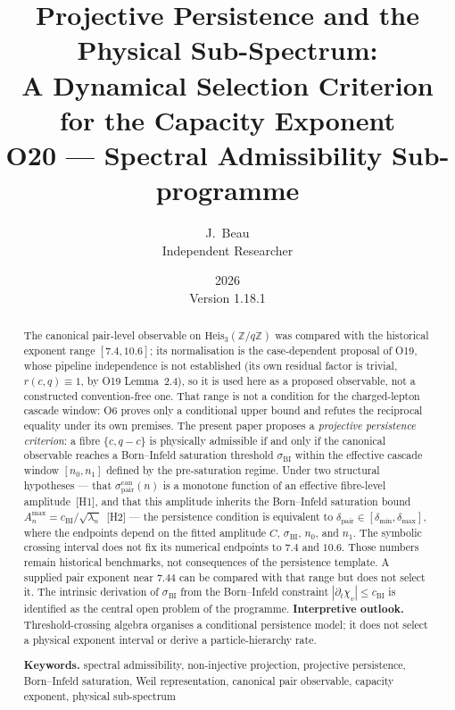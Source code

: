 \documentclass[11pt,a4paper]{article}
\title{Projective Persistence and the Physical Sub-Spectrum:\\
A Dynamical Selection Criterion for the Capacity Exponent\\[0.5ex]
\large O20 --- Spectral Admissibility Sub-programme}
\author{J.~Beau\\[0.5ex]
\small Independent Researcher}
\date{2026\\Version 1.18.1}
\theoremstyle{definition}
\theoremstyle{remark}
\begin{document}
  \maketitle

  \begin{abstract}
    The canonical pair-level observable on $\mathrm{Heis}_3(\mathbb{Z}/q\mathbb{Z})$
    was compared with the historical exponent range $[7.4,10.6]$; its normalisation is the
    case-dependent proposal of O19, whose pipeline independence is not established (its own residual factor is trivial, $r(c,q)\equiv1$, by O19 Lemma~2.4), so it is used here as a
    proposed observable, not a constructed convention-free one.
    That range is not a condition for the charged-lepton cascade window: O6 proves only a
    conditional upper bound and refutes the reciprocal equality under its own premises.
    The present paper proposes a \emph{projective persistence criterion}:
    a fibre $\{c, q-c\}$ is physically admissible if and only if the
    canonical observable reaches a Born--Infeld saturation threshold
    $\sigma_{\mathrm{BI}}$ within the effective cascade window
    $[n_0, n_1]$ defined by the pre-saturation regime.
    Under two structural hypotheses --- that
    $\sigma_{\mathrm{pair}}^{\mathrm{can}}(n)$ is a monotone function of
    an effective fibre-level amplitude~[H1], and that this amplitude
    inherits the Born--Infeld saturation bound
    $A_n^{\max} = c_{\mathrm{BI}}/\sqrt{\lambda_n}$~[H2] --- the persistence
    condition is equivalent to
    $\delta_{\mathrm{pair}} \in [\delta_{\min}, \delta_{\max}]$,
    where the endpoints depend on the fitted amplitude $C$, $\sigma_{\mathrm{BI}}$,
    $n_0$, and $n_1$.
    The symbolic crossing interval does not fix its numerical endpoints to $7.4$ and $10.6$.
    Those numbers remain historical benchmarks, not consequences of the persistence template.
    A supplied pair exponent near $7.44$ can be compared with that range but does not select it.
    The intrinsic derivation of $\sigma_{\mathrm{BI}}$ from the
    Born--Infeld constraint $|\partial_t \chi_v| \leq c_{\mathrm{BI}}$ is
    identified as the central open problem of the programme.
    \textbf{Interpretive outlook.}
    Threshold-crossing algebra organises a conditional persistence model; it does not select a
    physical exponent interval or derive a particle-hierarchy rate.

    \medskip
    \noindent\textbf{Keywords.}
    spectral admissibility, non-injective projection, projective
    persistence, Born--Infeld saturation, Weil representation,
    canonical pair observable, capacity exponent, physical sub-spectrum
  \end{abstract}
\end{document}
